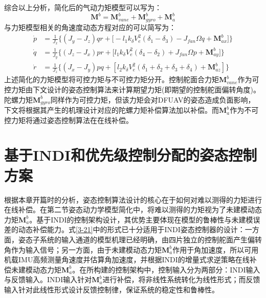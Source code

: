 综合以上分析，简化后的气动力矩模型可以写为：
\begin{equation}
    \boldsymbol{M}^b=\boldsymbol{M}_{vane}^b+\boldsymbol{M}_{gyro}^b+\boldsymbol{M}_{a}^b
    \label{3-20}
\end{equation}
与力矩模型相关的角速度动态方程对应的可以简写为：
\begin{equation}
    \begin{aligned}
        \dot{p}  &=\frac{1}{J_x}\Bigg\{ (J_y-J_z)qr+
        \big[- l_1k_\delta V_e^2(\delta_1 - \delta_3)-J_{fan}\Omega{q} +\boldsymbol{M}_{ax}^b\big]\Bigg\} \\
        \dot{q}  &=\frac{1}{J_y}\Bigg\{ (J_z-J_x)pr+
        \big[l_1k_\delta V_e^2(\delta_4 - \delta_2)+J_{fan}\Omega{p} +\boldsymbol{M}_{ay}^b\big]\Bigg\} \\
        \dot{r}  &=\frac{1}{J_z}\Bigg\{ (J_x-J_y)pq+
        \left[l_2k_\delta V_e^2(\delta_1 + \delta_2 + \delta_3 + \delta_4) + \boldsymbol{M}_{az}^b\right]
        \Bigg\}
    \end{aligned}
    \label{3-21}
\end{equation}
上述简化的力矩模型将可控力矩与不可控力矩分开。控制舵面合力矩$\boldsymbol{M}_{vane}^b$作为可控力矩由下文设计的姿态控制算法来计算期望力矩(即期望的控制舵面偏转角度)。陀螺力矩$\boldsymbol{M}_{gyro}^b$同样作为可控力矩，但该力矩会对DFUAV的姿态造成负面影响，下文将根据其产生的机理设计对应的陀螺力矩补偿算法加以补偿。而$\boldsymbol{M}_{a}^b$作为不可控力矩将通过姿态控制算法在在线补偿。

\section{基于INDI和优先级控制分配的姿态控制方案}

根据本章开篇时的分析，姿态控制算法设计的核心在于如何对难以测得的力矩进行在线补偿。在第二节姿态动力学模型简化中，将难以测得的力矩视为了未建模动态力矩$\boldsymbol{M}_{a}^b$。基于INDI的控制架构设计，其优势主要体现在模型的鲁棒性与未建模误差的动态补偿能力。式\eqref{3-21}中的形式已十分适用于INDI姿态控制器的设计：一方面，姿态子系统的输入通道的模型机理已经明确，由四片独立的控制舵面产生偏转角作为输入信号；另一方面，由于未建模动态力矩$\boldsymbol{M}_{a}^b$作用于角加速度，所以可用机载IMU高频测量角速度并估算角加速度，并根据INDI的增量式求逆策略在线补偿未建模动态力矩$\boldsymbol{M}_{a}^b$。在所构建的控制架构中，控制输入分为两部分：INDI输入与反馈输入。INDI输入针对$\boldsymbol{M}_{a}^b$进行补偿，将非线性系统转化为线性形式；而反馈输入针对此线性形式设计反馈控制律，保证系统的稳定性和鲁棒性。


